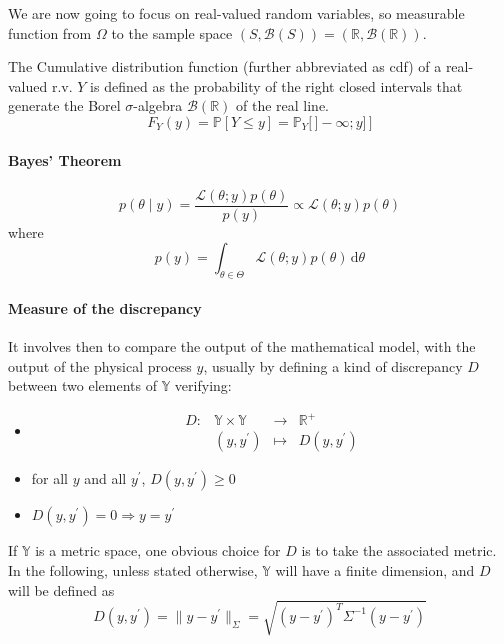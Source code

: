 \documentclass[a4paper,11pt]{article}
\newcommand{\Prob}{\mathbb{P}}
\newcommand{\Yspace}{\mathbb{Y}}
\theoremstyle{defi}
\numberwithin{thmCounter}{section}
\begin{document}
We are now going to focus on real-valued random variables, so measurable function from $\Omega$ to the sample space $(S,\mathcal{B}(S)) = (\mathbb{R},\mathcal{B}(\mathbb{R}))$.
\begin{definition}
  \label{def:pdf}
  The Cumulative distribution function (further abbreviated as cdf) of a real-valued r.v. $Y$ is defined as the probability of the right closed intervals that generate the Borel $\sigma$-algebra $\mathcal{B}(\mathbb{R})$ of the real line.
  \begin{equation}
    F_{Y}(y) = \Prob\left[Y \leq y\right] = \Prob_Y\big[\,]-\infty; y]\, \big]
  \end{equation}
\end{definition}

\paragraph{Bayes' Theorem}
\label{ssec:bayes_theorem}
\begin{theorem}
  \begin{equation}
  p(\theta \mid y) = \frac{\mathcal{L}(\theta;y)p(\theta)}{p(y)} \propto \mathcal{L}(\theta;y)p(\theta)
  \end{equation}
  where
  \begin{equation}
    p(y) = \int_{\theta \in \Theta} \mathcal{L}(\theta;y)p(\theta)\, \mathrm{d}\theta
  \end{equation}
\end{theorem}

\paragraph{Measure of the discrepancy}

 It involves then to compare the output of the mathematical model, with the output of the physical process $y$, usually by defining a kind of discrepancy $D$ between two elements of $\Yspace$ verifying:
\begin{itemize}
\item 
\begin{equation*}
  \begin{array}{cccc}
    D:& \Yspace \times \Yspace& \longrightarrow&\mathbb{R}^+ \\
     & (y,y^{\prime}) & \longmapsto & D(y, y^{\prime})
  \end{array}
\end{equation*}
\item for all $y$ and all $y^{\prime}$, $D(y, y^{\prime})\geq 0$
\item $D(y, y^{\prime}) = 0 \Rightarrow y = y^{\prime}$
\end{itemize}
If $\Yspace$ is a metric space, one obvious choice for $D$ is to take the associated metric. In the following, unless stated otherwise, $\Yspace$ will have a finite dimension, and $D$ will be defined as
\begin{equation}
  D(y, y^{\prime}) = \|y - y^{\prime}\|_{\Sigma} = \sqrt{(y - y^{\prime})^T\Sigma^{-1}(y - y^{\prime})}
\end{equation}
\end{document}
